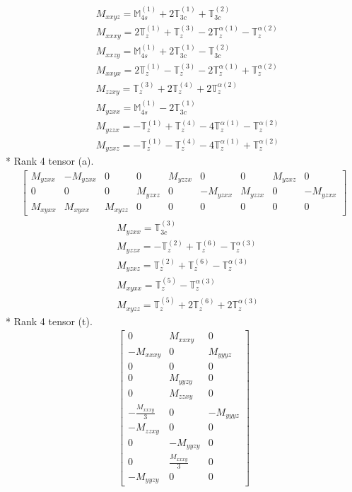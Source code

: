 \documentclass[fleqn,8pt,landscape]{jsarticle}
\begin{document}
\begin{align*}
& M_{xxyz} = \mathbb{M}_{4s}^{(1)} + 2 \mathbb{T}_{3c}^{(1)} + \mathbb{T}_{3c}^{(2)} \\
& M_{xxxy} = 2 \mathbb{T}_{z}^{(1)} + \mathbb{T}_{z}^{(3)} - 2 \mathbb{T}_{z}^{\alpha(1)} - \mathbb{T}_{z}^{\alpha(2)} \\
& M_{xxzy} = \mathbb{M}_{4s}^{(1)} + 2 \mathbb{T}_{3c}^{(1)} - \mathbb{T}_{3c}^{(2)} \\
& M_{xxyx} = 2 \mathbb{T}_{z}^{(1)} - \mathbb{T}_{z}^{(3)} - 2 \mathbb{T}_{z}^{\alpha(1)} + \mathbb{T}_{z}^{\alpha(2)} \\
& M_{zzxy} = \mathbb{T}_{z}^{(3)} + 2 \mathbb{T}_{z}^{(4)} + 2 \mathbb{T}_{z}^{\alpha(2)} \\
& M_{yzxx} = \mathbb{M}_{4s}^{(1)} - 2 \mathbb{T}_{3c}^{(1)} \\
& M_{yzzx} = - \mathbb{T}_{z}^{(1)} + \mathbb{T}_{z}^{(4)} - 4 \mathbb{T}_{z}^{\alpha(1)} - \mathbb{T}_{z}^{\alpha(2)} \\
& M_{yzxz} = - \mathbb{T}_{z}^{(1)} - \mathbb{T}_{z}^{(4)} - 4 \mathbb{T}_{z}^{\alpha(1)} + \mathbb{T}_{z}^{\alpha(2)}
\end{align*}
* Rank 4 tensor (a).
\begin{align*}
\begin{bmatrix} M_{yzxx} & - M_{yzxx} & 0 & 0 & M_{yzzx} & 0 & 0 & M_{yzxz} & 0 \\ 0 & 0 & 0 & M_{yzxz} & 0 & - M_{yzxx} & M_{yzzx} & 0 & - M_{yzxx} \\ M_{xyxx} & M_{xyxx} & M_{xyzz} & 0 & 0 & 0 & 0 & 0 & 0 \end{bmatrix}
\end{align*}
\begin{align*}
& M_{yzxx} = \mathbb{T}_{3c}^{(3)} \\
& M_{yzzx} = - \mathbb{T}_{z}^{(2)} + \mathbb{T}_{z}^{(6)} - \mathbb{T}_{z}^{\alpha(3)} \\
& M_{yzxz} = \mathbb{T}_{z}^{(2)} + \mathbb{T}_{z}^{(6)} - \mathbb{T}_{z}^{\alpha(3)} \\
& M_{xyxx} = \mathbb{T}_{z}^{(5)} - \mathbb{T}_{z}^{\alpha(3)} \\
& M_{xyzz} = \mathbb{T}_{z}^{(5)} + 2 \mathbb{T}_{z}^{(6)} + 2 \mathbb{T}_{z}^{\alpha(3)}
\end{align*}
* Rank 4 tensor (t).
\begin{align*}
\begin{bmatrix} 0 & M_{xxxy} & 0 \\ - M_{xxxy} & 0 & M_{yyyz} \\ 0 & 0 & 0 \\ 0 & M_{yyzy} & 0 \\ 0 & M_{zzxy} & 0 \\ - \frac{M_{xxxy}}{3} & 0 & - M_{yyyz} \\ - M_{zzxy} & 0 & 0 \\ 0 & - M_{yyzy} & 0 \\ 0 & \frac{M_{xxxy}}{3} & 0 \\ - M_{yyzy} & 0 & 0 \end{bmatrix}
\end{align*}
\end{document}
